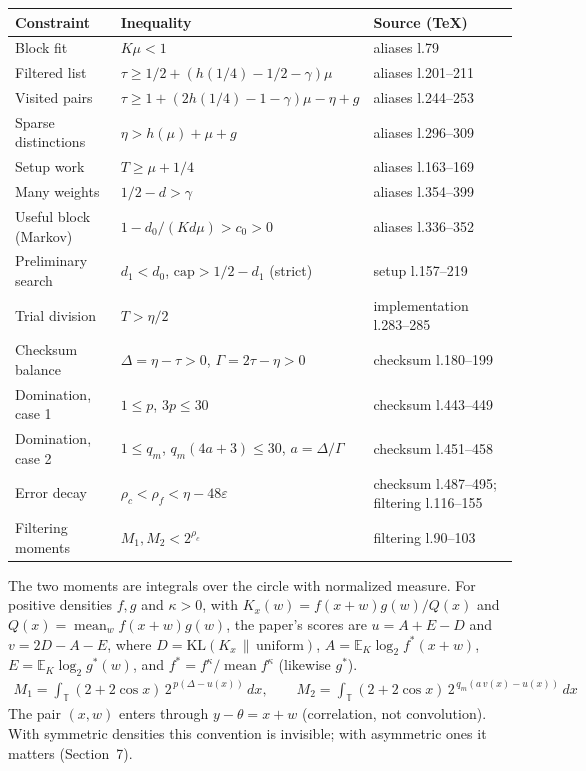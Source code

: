 \documentclass[11pt]{article}
\DeclareMathOperator{\mean}{mean}
\newcommand{\E}{\mathbb{E}}
\newcommand{\eps}{\varepsilon}
\newcommand{\KL}{\mathrm{KL}}
\theoremstyle{plain}
\begin{document}
\begin{center}
\small
\begin{tabularx}{\linewidth}{>{\raggedright\arraybackslash}p{3.2cm} L >{\raggedright\arraybackslash}p{3.6cm}}
\toprule
Constraint & Inequality & Source (TeX) \\
\midrule
Block fit & $K\mu < 1$ & aliases l.79 \\
Filtered list & $\tau \ge 1/2 + (h(1/4) - 1/2 - \gamma)\mu$ & aliases l.201--211 \\
Visited pairs & $\tau \ge 1 + (2h(1/4) - 1 - \gamma)\mu - \eta + g$ & aliases l.244--253 \\
Sparse distinctions & $\eta > h(\mu) + \mu + g$ & aliases l.296--309 \\
Setup work & $T \ge \mu + 1/4$ & aliases l.163--169 \\
Many weights & $1/2 - d > \gamma$ & aliases l.354--399 \\
Useful block (Markov) & $1 - d_0/(K d \mu) > c_0 > 0$ & aliases l.336--352 \\
Preliminary search & $d_1 < d_0$, $\mathrm{cap} > 1/2 - d_1$ (strict) & setup l.157--219 \\
Trial division & $T > \eta/2$ & implementation l.283--285 \\
Checksum balance & $\Delta = \eta - \tau > 0$, $\Gamma = 2\tau - \eta > 0$ & checksum l.180--199 \\
Domination, case 1 & $1 \le p$, $3p \le 30$ & checksum l.443--449 \\
Domination, case 2 & $1 \le q_m$, $q_m(4a + 3) \le 30$, $a = \Delta/\Gamma$ & checksum l.451--458 \\
Error decay & $\rho_c < \rho_f < \eta - 48\eps$ & checksum l.487--495; filtering l.116--155 \\
Filtering moments & $M_1, M_2 < 2^{\rho_c}$ & filtering l.90--103 \\
\bottomrule
\end{tabularx}
\end{center}

The two moments are integrals over the circle with normalized measure. For positive densities $f, g$ and $\kappa > 0$, with $K_x(w) = f(x+w)g(w)/Q(x)$ and $Q(x) = \mean_w f(x+w)g(w)$, the paper's scores are $u = A + E - D$ and $v = 2D - A - E$, where $D = \KL(K_x \,\|\, \mathrm{uniform})$, $A = \E_K \log_2 f^*(x+w)$, $E = \E_K \log_2 g^*(w)$, and $f^* = f^\kappa / \mean f^\kappa$ (likewise $g^*$).
\begin{gather*}
M_1 = \int_{\mathbb T} (2+2\cos x)\, 2^{\,p(\Delta - u(x))}\, dx, \qquad M_2 = \int_{\mathbb T} (2+2\cos x)\, 2^{\,q_m(a\, v(x) - u(x))}\, dx
\end{gather*}
The pair $(x, w)$ enters through $y - \theta = x + w$ (correlation, not convolution). With symmetric densities this convention is invisible; with asymmetric ones it matters (Section~7).
\end{document}
